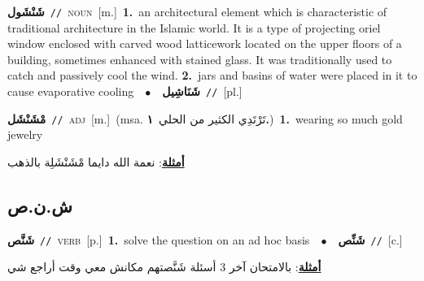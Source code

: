 \documentclass[10pt,a4paper,twoside]{article} %
\begin{document}
\begin{multicols}{2}
{\setlength\topsep{0pt}\textbf{\foreignlanguage{arabic}{شَنْشَول}}\ {\color{gray}\texttt{//}\color{black}}\ \textsc{noun}\ [m.]\ \textbf{1.}~an architectural element which is characteristic of traditional architecture in the Islamic world. It is a type of projecting oriel window enclosed with carved wood latticework located on the upper floors of a building, sometimes enhanced with stained glass. It was traditionally used to catch and passively cool the wind.  \textbf{2.}~jars and basins of water were placed in it to cause evaporative cooling\ \ $\bullet$\ \ \setlength\topsep{0pt}\textbf{\foreignlanguage{arabic}{شَنَاشِيل}}\ {\color{gray}\texttt{//}\color{black}}\ [pl.]\ } \vspace{2mm}

{\setlength\topsep{0pt}\textbf{\foreignlanguage{arabic}{مْشَنْشَل}}\ {\color{gray}\texttt{//}\color{black}}\ \textsc{adj}\ [m.]\ \color{gray}(msa. \foreignlanguage{arabic}{تَرْتَدِي الكثير من الحلي}~\foreignlanguage{arabic}{\textbf{١.}})\color{black}\ \textbf{1.}~wearing so much gold jewelry\  \begin{flushright}\color{gray}\foreignlanguage{arabic}{\textbf{\underline{\foreignlanguage{arabic}{أمثلة}}}: نعمة الله دايما مْشَنْشَلِة بالذهب}\end{flushright}\color{black}} \vspace{2mm}

\vspace{-3mm}
\subsection*{\color{blue}\foreignlanguage{arabic}{ش.ن.ص}\color{blue}{}} 

{\setlength\topsep{0pt}\textbf{\foreignlanguage{arabic}{شَنَّص}}\ {\color{gray}\texttt{//}\color{black}}\ \textsc{verb}\ [p.]\ \textbf{1.}~solve the question on an ad hoc basis\ \ $\bullet$\ \ \setlength\topsep{0pt}\textbf{\foreignlanguage{arabic}{شَنِّص}}\ {\color{gray}\texttt{//}\color{black}}\ [c.]\  \begin{flushright}\color{gray}\foreignlanguage{arabic}{\textbf{\underline{\foreignlanguage{arabic}{أمثلة}}}: بالامتحان آخر 3 أسئلة شَنَّصتهم مكانش معي وقت أراجع شي}\end{flushright}\color{black}} \vspace{2mm}


\end{multicols}
\end{document}
